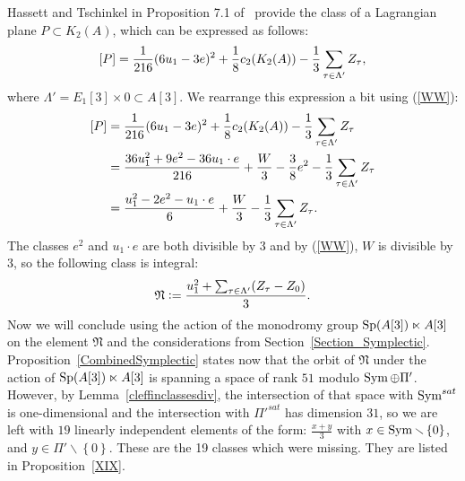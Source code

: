 Hassett and Tschinkel in Proposition 7.1 of~\cite{Hassett} provide the class of a Lagrangian plane $P\subset K_2(A)$, which can be expressed as follows:
$$\left[P\right]=\frac{1}{216}(6u_1-3e)^2+\frac{1}{8}c_2(K_{ 2 }( A ))-\frac{1}{3}\sum_{\tau\in \Lambda'} Z_{\tau},$$
where $\Lambda'=E_1[3]\times 0\subset A[3]$. We rearrange this expression a bit using (\ref{WW}):
\begin{align*}
\left[P\right]&=\frac{1}{216}(6u_1-3e)^2+\frac{1}{8}c_2(K_{ 2 }( A ))-\frac{1}{3}\sum_{\tau\in \Lambda'} Z_{\tau}\\
&=\frac{36u_1^2+9e^2-36u_1\cdot e}{216} +\frac{W}{3}-\frac{3}{8}e^2-\frac{1}{3}\sum_{\tau\in \Lambda'} Z_{\tau}\\
&=\frac{u_1^2-2e^2-u_1\cdot e}{6} +\frac{W}{3}-\frac{1}{3}\sum_{\tau\in \Lambda'} Z_{\tau}.
\end{align*}
The classes $e^2$ and $u_1\cdot e$ are both divisible by 3 and by (\ref{WW}), $W$ is divisible by 3, so the following class is integral:
$$
\mathfrak{N}\vcentcolon= \frac{u_1^2+\sum_{\tau\in \Lambda'} (Z_{\tau}-Z_0)}{3}
.
$$
Now we will conclude using the action of the monodromy group $\operatorname{Sp}(A[3])\ltimes A[3]$ on the element $\mathfrak{N}$ and the considerations from Section~\ref{Section_Symplectic}. 
Proposition~\ref{CombinedSymplectic} states now that
the orbit of $\mathfrak{N}$ under the action of $\operatorname{Sp}(A[3])\ltimes A[3]$ is spanning a space of rank $51$ modulo $\operatorname{Sym}\oplus\Pi'$. However, by Lemma~\ref{cleffinclassesdiv}, the intersection of that space with $\operatorname{Sym}^{sat}$ is one-dimensional and the intersection with $\Pi'^{sat}$ has dimension $31$, so we are left with $19$ linearly independent elements of the form:
$\frac{x+y}{3}$ with $x\in \operatorname{Sym}\smallsetminus \left\{0\right\}$, and $y\in \Pi'\smallsetminus \left\{0\right\}$. These are the 19 classes which were missing. They are listed in Proposition~\ref{XIX}.
